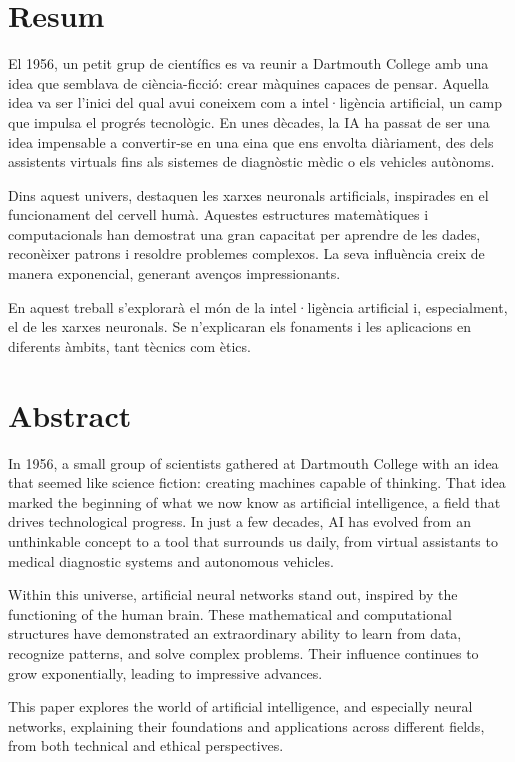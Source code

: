 %
%
\section*{Resum}
El 1956, un petit grup de científics es va reunir a Dartmouth College amb una idea que semblava de ciència-ficció: crear màquines capaces de pensar. Aquella idea va ser l'inici del qual avui coneixem com a intel·ligència artificial, un camp que impulsa el progrés tecnològic. En unes dècades, la IA ha passat de ser una idea impensable a convertir-se en una eina que ens envolta diàriament, des dels assistents virtuals fins als sistemes de diagnòstic mèdic o els vehicles autònoms.\par

Dins aquest univers, destaquen les xarxes neuronals artificials, inspirades en el funcionament del cervell humà. Aquestes estructures matemàtiques i computacionals han demostrat una gran capacitat per aprendre de les dades, reconèixer patrons i resoldre problemes complexos. La seva influència creix de manera exponencial, generant avenços impressionants.\par

En aquest treball s'explorarà el món de la intel·ligència artificial i, especialment, el de les xarxes neuronals. Se n'explicaran els fonaments i les aplicacions en diferents àmbits, tant tècnics com ètics.
%
%
\section*{Abstract}
In 1956, a small group of scientists gathered at Dartmouth College with an idea that seemed like science fiction: creating machines capable of thinking. That idea marked the beginning of what we now know as artificial intelligence, a field that drives technological progress. In just a few decades, AI has evolved from an unthinkable concept to a tool that surrounds us daily, from virtual assistants to medical diagnostic systems and autonomous vehicles.\par

Within this universe, artificial neural networks stand out, inspired by the functioning of the human brain. These mathematical and computational structures have demonstrated an extraordinary ability to learn from data, recognize patterns, and solve complex problems. Their influence continues to grow exponentially, leading to impressive advances.\par

This paper explores the world of artificial intelligence, and especially neural networks, explaining their foundations and applications across different fields, from both technical and ethical perspectives.


